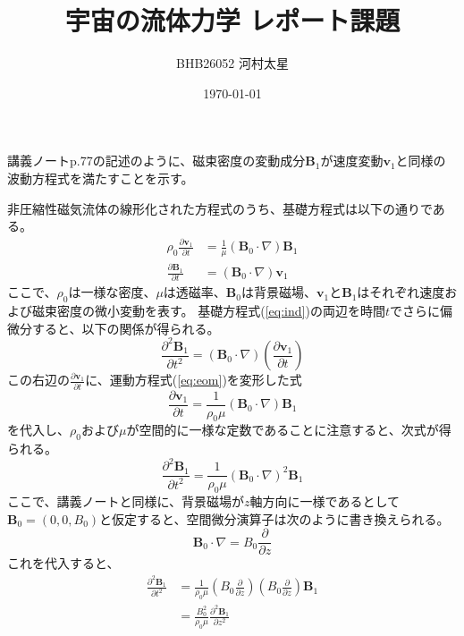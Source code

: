 \documentclass[autodetect-engine,11pt,a4paper]{bxjsarticle}
\title{\Large\textbf{宇宙の流体力学 レポート課題}}
\author{BHB26052 河村太星}
\date{\today}
\begin{document}
\maketitle

講義ノートp.77の記述のように、磁束密度の変動成分$\bm{B}_1$が速度変動$\bm{v}_1$と同様の波動方程式を満たすことを示す。

非圧縮性磁気流体の線形化された方程式のうち、基礎方程式は以下の通りである。
\begin{align}
    \rho_{0}\frac{\partial \bm{v}_{1}}{\partial t} &= \frac{1}{\mu}(\bm{B}_{0}\cdot\nabla)\bm{B}_1 \label{eq:eom} \\
    \frac{\partial \bm{B}_{1}}{\partial t} &= (\bm{B}_{0}\cdot\nabla)\bm{v}_{1} \label{eq:ind}
\end{align}
ここで、$\rho_0$は一様な密度、$\mu$は透磁率、$\bm{B}_0$は背景磁場、$\bm{v}_1$と$\bm{B}_1$はそれぞれ速度および磁束密度の微小変動を表す。
基礎方程式(\ref{eq:ind})の両辺を時間$t$でさらに偏微分すると、以下の関係が得られる。
\begin{equation}
    \frac{\partial^{2}\bm{B}_{1}}{\partial t^{2}} = (\bm{B}_{0}\cdot\nabla)\left(\frac{\partial \bm{v}_{1}}{\partial t}\right)
\end{equation}
この右辺の$\frac{\partial \bm{v}_{1}}{\partial t}$に、運動方程式(\ref{eq:eom})を変形した式
\begin{equation}
    \frac{\partial \bm{v}_{1}}{\partial t} = \frac{1}{\rho_{0}\mu}(\bm{B}_{0}\cdot\nabla)\bm{B}_1
\end{equation}
を代入し、$\rho_0$および$\mu$が空間的に一様な定数であることに注意すると、次式が得られる。
\begin{equation}
    \frac{\partial^{2}\bm{B}_{1}}{\partial t^{2}} = \frac{1}{\rho_{0}\mu}(\bm{B}_{0}\cdot\nabla)^{2} \bm{B}_1
\end{equation}
ここで、講義ノートと同様に、背景磁場が$z$軸方向に一様であるとして$\bm{B}_{0} = (0, 0, B_{0})$と仮定すると、空間微分演算子は次のように書き換えられる。
\begin{equation}
    \bm{B}_{0}\cdot\nabla = B_{0}\frac{\partial}{\partial z}
\end{equation}
これを代入すると、
\begin{align}
    \frac{\partial^{2}\bm{B}_{1}}{\partial t^{2}} &= \frac{1}{\rho_{0}\mu}\left( B_{0}\frac{\partial}{\partial z} \right)\left( B_{0}\frac{\partial}{\partial z} \right) \bm{B}_1 \\
    &= \frac{B_{0}^{2}}{\rho_{0}\mu}\frac{\partial^{2}\bm{B}_{1}}{\partial z^{2}}
\end{align}
\end{document}
